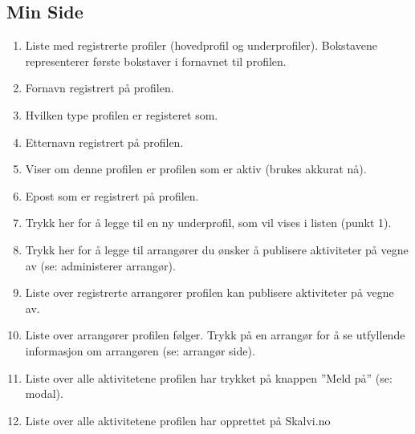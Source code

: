 \subsection{Min Side}
\begin{center}
\end{center}
\begin{enumerate}
    \item Liste med registrerte profiler (hovedprofil og underprofiler). Bokstavene representerer første bokstaver i fornavnet til profilen.
    \item Fornavn registrert på profilen. 
    \item Hvilken type profilen er registeret som.
    \item Etternavn registrert på profilen.
    \item Viser om denne profilen er profilen som er aktiv (brukes akkurat nå).
    \item Epost som er registrert på profilen.
    \item Trykk her for å legge til en ny underprofil, som vil vises i listen (punkt 1).
    \item Trykk her for å legge til arrangører du ønsker å publisere aktiviteter på vegne av (se: administerer arrangør).
    \item Liste over registrerte arrangører profilen kan publisere aktiviteter på vegne av.
    \item Liste over arrangører profilen følger. Trykk på en arrangør for å se utfyllende informasjon om arrangøren (se: arrangør side).
    \item Liste over alle aktivitetene profilen har trykket på knappen ”Meld på” (se: modal).
    \item Liste over alle aktivitetene profilen har opprettet på Skalvi.no
\end{enumerate}

